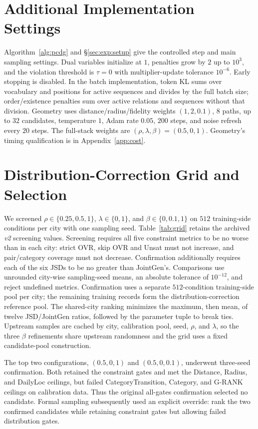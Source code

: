 \appendix

\section{Additional Implementation Settings}
\label{app:algo}
Algorithm~\ref{alg:pcdg} and \S\ref{sec:exp:setup} give the controlled step
and main sampling settings. Dual variables initialize at $1$,
penalties grow by $2$ up to $10^3$, and the violation threshold is $\tau=0$
with multiplier-update tolerance $10^{-6}$. Early stopping is disabled.
In the batch implementation, token KL sums over vocabulary and positions for
active sequences and divides by the full batch size; order/existence penalties
sum over active relations and sequences without that division.
Geometry uses distance/radius/fidelity weights $(1,2,0.1)$, $8$ paths, up to
$32$ candidates, temperature $1$, Adam rate $0.05$, $200$ steps, and noise
refresh every $20$ steps. The full-stack weights are $(\rho,\lambda,\beta)=(0.5,0,1)$.
Geometry's timing qualification is in Appendix~\ref{app:cost}.

\section{Distribution-Correction Grid and Selection}
\label{app:grid}
We screened
$\rho\in\{0.25,0.5,1\}$, $\lambda\in\{0,1\}$, and $\beta\in\{0,0.1,1\}$
on $512$ training-side conditions per city with one sampling seed.
Table~\ref{tab:grid} retains the archived \emph{v2} screening values.
Screening requires all five constraint metrics to be no worse than \pcdgp
in each city: strict OVR, skip OVR and Unsat must not increase, and pair/category
coverage must not decrease. Confirmation additionally requires each of the six
JSDs to be no greater than JointGen's. Comparisons use unrounded city-wise
sampling-seed means, an absolute tolerance of $10^{-12}$, and reject undefined
metrics. Confirmation uses a separate $512$-condition training-side pool per city;
the remaining training records form the distribution-correction reference pool.
The shared-city ranking minimizes the maximum, then mean, of twelve
JSD/JointGen ratios, followed by the parameter tuple to break ties.
Upstream samples are cached by city, calibration pool, seed, $\rho$, and
$\lambda$, so the three $\beta$ refinements share upstream randomness and
the grid uses a fixed candidate-pool construction.


The top two configurations, $(0.5,0,1)$ and $(0.5,0,0.1)$, underwent
three-seed confirmation. Both retained the constraint gates and met the
Distance, Radius, and DailyLoc ceilings, but failed CategoryTransition,
Category, and G-RANK ceilings on calibration data. Thus the original
all-gates confirmation selected no candidate. Formal sampling subsequently
used an explicit override: rank the two confirmed candidates while retaining
constraint gates but allowing failed distribution gates.

